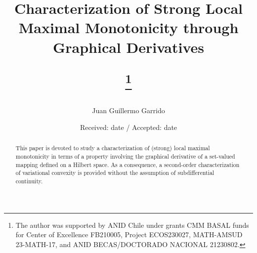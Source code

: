 \documentclass[smallextended,envcountsect,envcountsame]{svjour3}
\newcommand{\1}{\mathds{1}}
\begin{document}
	
	\title{Characterization of Strong Local Maximal Monotonicity through Graphical Derivatives%
	
	\thanks{The author was supported by ANID Chile under grants CMM BASAL funds for Center of Excellence FB210005, Project ECOS230027, MATH-AMSUD 23-MATH-17, and ANID BECAS/DOCTORADO NACIONAL 21230802.}
 }
	
	\author{Juan Guillermo Garrido
	}
	
	
	\date{Received: date / Accepted: date}
	
	
	\maketitle
	
	\begin{abstract}
		This paper is devoted to study a characterization of (strong) local maximal monotonicity in terms of a property involving the graphical derivative of a set-valued mapping defined on a Hilbert space. As a consequence, a second-order characterization of variational convexity is provided without the assumption of subdifferential continuity.
	\end{abstract}
	
\end{document}
